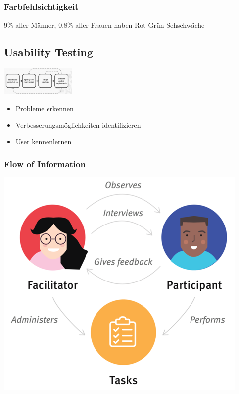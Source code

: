\documentclass[a4paper, landscape, 8pt]{scrartcl}
\begin{document}
\begin{multicols*}{4}
        \subsubsection{Farbfehlsichtigkeit}
        9\% aller Männer, 0.8\% aller Frauen haben Rot-Grün Sehschwäche

        \subsection{Usability Testing}
        \includegraphics[width=\columnwidth, height=40pt]{graphic/15-usability-testflow}
        \begin{itemize}
            \item Probleme erkennen
            \item Verbesserungsmöglichkeiten identifizieren
            \item User kennenlernen
        \end{itemize}

        \subsubsection{Flow of Information}
        \includegraphics[scale=0.24]{graphic/16-usability-flow-information}
        

\end{multicols*}
\end{document}
